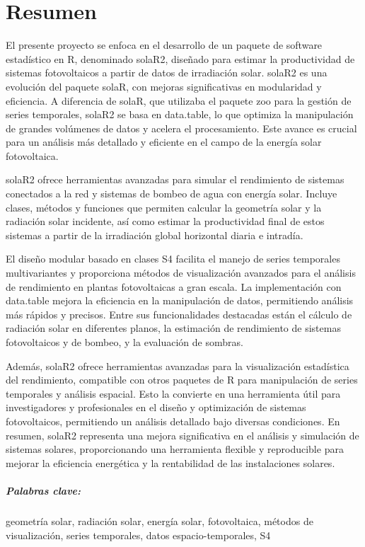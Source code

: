 \chapter*{Resumen}
El presente proyecto se enfoca en el desarrollo de un paquete de software estadístico en R, denominado solaR2, diseñado para estimar la productividad de sistemas fotovoltaicos a partir de datos de irradiación solar. solaR2 es una evolución del paquete solaR, con mejoras significativas en modularidad y eficiencia. A diferencia de solaR, que utilizaba el paquete zoo para la gestión de series temporales, solaR2 se basa en data.table, lo que optimiza la manipulación de grandes volúmenes de datos y acelera el procesamiento. Este avance es crucial para un análisis más detallado y eficiente en el campo de la energía solar fotovoltaica.

solaR2 ofrece herramientas avanzadas para simular el rendimiento de sistemas conectados a la red y sistemas de bombeo de agua con energía solar. Incluye clases, métodos y funciones que permiten calcular la geometría solar y la radiación solar incidente, así como estimar la productividad final de estos sistemas a partir de la irradiación global horizontal diaria e intradía.

El diseño modular basado en clases S4 facilita el manejo de series temporales multivariantes y proporciona métodos de visualización avanzados para el análisis de rendimiento en plantas fotovoltaicas a gran escala. La implementación con data.table mejora la eficiencia en la manipulación de datos, permitiendo análisis más rápidos y precisos. Entre sus funcionalidades destacadas están el cálculo de radiación solar en diferentes planos, la estimación de rendimiento de sistemas fotovoltaicos y de bombeo, y la evaluación de sombras.

Además, solaR2 ofrece herramientas avanzadas para la visualización estadística del rendimiento, compatible con otros paquetes de R para manipulación de series temporales y análisis espacial. Esto la convierte en una herramienta útil para investigadores y profesionales en el diseño y optimización de sistemas fotovoltaicos, permitiendo un análisis detallado bajo diversas condiciones. En resumen, solaR2 representa una mejora significativa en el análisis y simulación de sistemas solares, proporcionando una herramienta flexible y reproducible para mejorar la eficiencia energética y la rentabilidad de las instalaciones solares.

\paragraph{Palabras clave:}
geometría solar, radiación solar, energía solar, fotovoltaica, métodos de visualización, series temporales, datos espacio-temporales, S4

